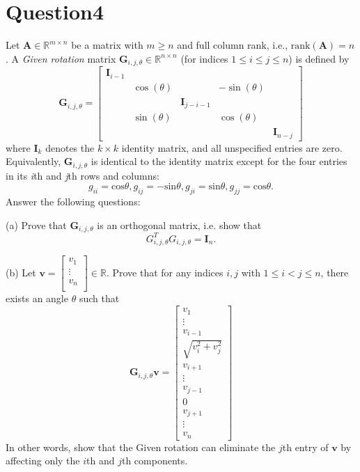 \documentclass{article}
\newcommand{\R}{\mathbb{R}}
\begin{document}
\section*{Question4}
Let \(\bm{A} \in \R^{m \times n}\) be a matrix with \(m \geq n\) and full column rank, i.e., \(\text{rank}(\bm{A}) = n\). A \textit{Given rotation} matrix \(\bm{G}_{i, j, \theta} \in \R^{n \times n}\) (for indices \(1 \leq i \leq j \leq n\)) is defined by
\[
    \bm{G}_{i, j, \theta} = \begin{bmatrix}
        \bm{I}_{i-1} &  &  &  &  \\
                     & \cos(\theta) &  & -\sin(\theta) & \\
                     & & \bm{I}_{j - i - 1}& & \\
         & \sin(\theta) && \cos(\theta) &\\
         & &&& \bm{I}_{n-j}
    \end{bmatrix}
\]
where \(\bm{I}_k\) denotes the \(k \times k\) identity matrix, and all unspecified entries are zero. 
Equivalently, \(\bm{G}_{i, j, \theta}\) is identical to the identity matrix except for the four entries in its \textit{i}th and \textit{j}th rows and columns:
\[
    g_{ii} = \text{cos}\theta, g_{ij} = -\text{sin}\theta, g_{ji} = \text{sin}\theta, g_{jj} = \text{cos}\theta.
\] 
Answer the following questions:

(a) Prove that \(\bm{G}_{i,j,\theta}\) is an orthogonal matrix, i.e. show that
\[
    G_{i,j,\theta}^TG_{i,j,\theta} = \bm{I}_n.
\]

(b) Let \(\bm{v} = \begin{bmatrix}
    v_1 \\
    \vdots \\
    v_n \\
\end{bmatrix} \in \R\). Prove that for any indices \(i, j\) with \(1 \leq i < j \leq n\), there exists an angle \(\theta\) such that
\[
    \bm{G}_{i,j,\theta}\bm{v} = \begin{bmatrix}
        v_1 \\
        \vdots \\
        v_{i-1} \\
        \sqrt{v_i^2 + v_j^2} \\
        v_{i+1} \\
        \vdots \\
        v_{j-1} \\
        0 \\
        v_{j+1} \\
        \vdots \\
        v_n
    \end{bmatrix}
\]
In other words, show that the Given rotation can eliminate the \(j\)th entry of \(\bm{v}\) by affecting only the \(i\)th and \(j\)th components.
\end{document}
